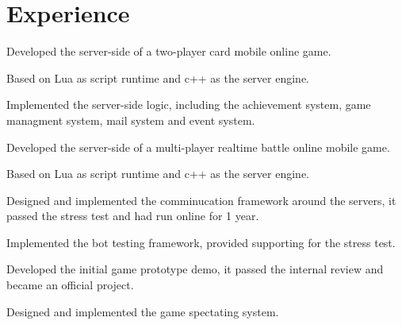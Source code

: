 \documentclass[]{deedy-resume-openfont}
\begin{document}
\hfill
\begin{minipage}[t]{0.73\textwidth} 


\section{Experience}
\sectionsep
{}
\location{}
\vspace{\topsep}
\begin{tightemize}
    \item Developed the server-side of a two-player card mobile online game. 
    \item Based on Lua as script runtime and c++ as the server engine. 
    \item Implemented the server-side logic, including the achievement system, game managment system, mail system and event system.
\end{tightemize}
\sectionsep

\begin{tightemize}
    \item Developed the server-side of a multi-player realtime battle online mobile game.
    \item Based on Lua as script runtime and c++ as the server engine. 
    \item Designed and implemented the comminucation framework around the servers, it passed the stress test and had run online for 1 year.
    \item Implemented the bot testing framework, provided supporting for the stress test.
\end{tightemize}
\sectionsep

\begin{tightemize}
\item Developed the initial game prototype demo, it passed the internal review and became an official project.
\item Designed and implemented the game spectating system.
\end{tightemize}
\sectionsep


\end{minipage}
\end{document}
